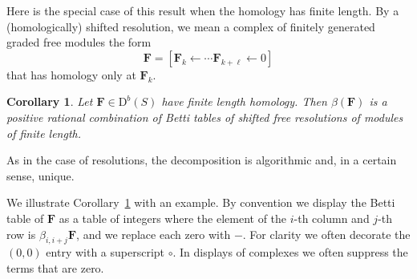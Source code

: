 \documentclass[12pt]{amsart}
\newtheorem{cor}[lemma]{Corollary}
\theoremstyle{definition}
\theoremstyle{remark}
\newcommand{\FF}{\mathbf{F}}
\newcommand{\DD}{\mathrm{D}}
\begin{document}
%

 Here is the special case of this result when the homology has finite length. By a (homologically) shifted resolution, we mean a complex of
finitely generated graded free modules the form
$$
\FF= [\FF_{k}\leftarrow\cdots \FF_{k+\ell}\leftarrow 0]
$$
that has homology only at $\FF_{k}$.
 
\begin{cor}\label{cor:decompose}
Let $\FF\in \DD^b(S)$ have finite length homology.  Then $\beta(\FF)$ is a positive rational combination of Betti tables of shifted free resolutions of modules of finite length. 
\end{cor}
As in the case of resolutions, the decomposition is algorithmic and, in a certain sense, unique.

We illustrate Corollary~\ref{cor:decompose} with an example.  By convention we display the Betti table of $\FF$ as a table
of integers where the element of the $i$-th column and $j$-th row is $\beta_{i,i+j}\FF$, and we replace each zero with $-$. For clarity we often decorate the $(0,0)$ entry
with a superscript $\circ$. In displays of complexes we often suppress the terms that are zero.
\end{document}
